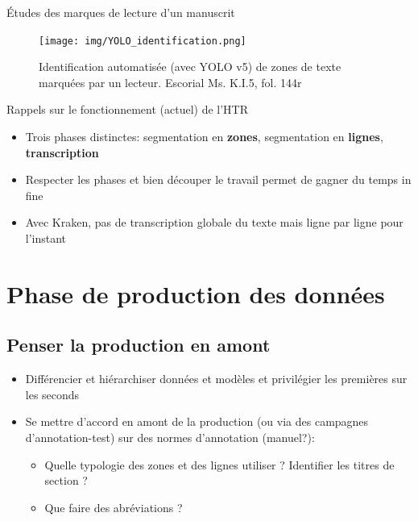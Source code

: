 \documentclass[11pt,aspectratio=169]{beamer}
\begin{document}
\begin{frame}{Études des marques de lecture d'un manuscrit}
\begin{figure}
\texttt{[image: img/YOLO\_identification.png]}
\caption{Identification automatisée  (avec YOLO v5) de zones de texte marquées par un lecteur. Escorial Ms. K.I.5, fol. 144r}
\end{figure}
\end{frame}


\begin{frame}{Rappels sur le fonctionnement (actuel) de l'HTR}

\begin{itemize}
\item Trois phases distinctes: segmentation en \textbf{zones}, segmentation en \textbf{lignes}, \textbf{transcription}
\pause\item Respecter les phases et bien découper le travail permet de gagner du temps in fine
\pause\item Avec Kraken, pas de transcription globale du texte mais ligne par ligne pour l'instant
\end{itemize}
\end{frame}

\section{Phase de production des données}

\subsection{Penser la production en amont}

\begin{frame}
\begin{itemize}
\item Différencier et hiérarchiser données et modèles et privilégier les premières sur les seconds
\pause\item Se mettre d'accord en amont de la production (ou via des campagnes d'annotation-test) sur des normes d'annotation (manuel?):

	\begin{itemize}
	\pause\item Quelle typologie des zones et des lignes utiliser ? Identifier les titres de section ?
	\pause\item Que faire des abréviations ?
	\end{itemize}
\end{itemize}
\end{frame}
\end{document}
